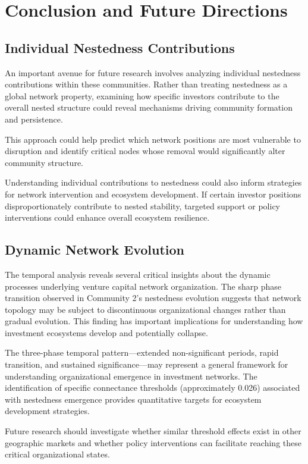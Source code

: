 
\section{Conclusion and Future Directions}

\subsection{Individual Nestedness Contributions}

An important avenue for future research involves analyzing individual nestedness contributions within these communities. Rather than treating nestedness as a global network property, examining how specific investors contribute to the overall nested structure could reveal mechanisms driving community formation and persistence. 

This approach could help predict which network positions are most vulnerable to disruption and identify critical nodes whose removal would significantly alter community structure.

Understanding individual contributions to nestedness could also inform strategies for network intervention and ecosystem development. If certain investor positions disproportionately contribute to nested stability, targeted support or policy interventions could enhance overall ecosystem resilience.

\subsection{Dynamic Network Evolution}

The temporal analysis reveals several critical insights about the dynamic processes underlying venture capital network organization. The sharp phase transition observed in Community 2's nestedness evolution suggests that network topology may be subject to discontinuous organizational changes rather than gradual evolution. This finding has important implications for understanding how investment ecosystems develop and potentially collapse.

The three-phase temporal pattern—extended non-significant periods, rapid transition, and sustained significance—may represent a general framework for understanding organizational emergence in investment networks. The identification of specific connectance thresholds (approximately 0.026) associated with nestedness emergence provides quantitative targets for ecosystem development strategies. 

Future research should investigate whether similar threshold effects exist in other geographic markets and whether policy interventions can facilitate reaching these critical organizational states.

